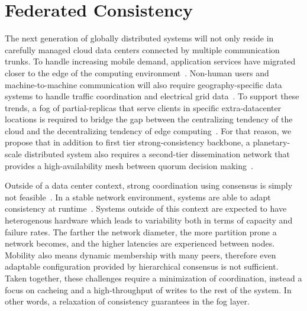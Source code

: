 
\renewcommand{\thechapter}{4}

\chapter{Federated Consistency}
\label{ch:federated_consistency}

The next generation of globally distributed systems will not only reside in carefully managed cloud data centers connected by multiple communication trunks.
To handle increasing mobile demand, application services have migrated closer to the edge of the computing environment~\cite{edge_computing}.
Non-human users and machine-to-machine communication will also require geography-specific data systems to handle traffic coordination and electrical grid data~\cite{cisco_internet_trends,sensor_networks,smart_grid,sotis,iot}.
To support these trends, a fog of partial-replicas that serve clients in specific extra-datacenter locations is required to bridge the gap between the centralizing tendency of the cloud and the decentralizing tendency of edge computing~\cite{fog,fog_mobile,fog_iot}.
For that reason, we propose that in addition to first tier strong-consistency backbone, a planetary-scale distributed system also requires a second-tier dissemination network that provides a high-availability mesh between quorum decision making~\cite{oceanstore}.

Outside of a data center context, strong coordination using consensus is simply not feasible~\cite{sensor_coordination}.
In a stable network environment, systems are able to adapt consistency at runtime~\cite{chihoub_harmony:_2012,chihoub_consistency_2013,kraska_consistency_2009,pitoura_data_1999,deno-toc}.
Systems outside of this context are expected to have heterogenous hardware which leads to variability both in terms of capacity and failure rates.
The farther the network diameter, the more partition prone a network becomes, and the higher latencies are experienced between nodes.
Mobility also means dynamic membership with many peers, therefore even adaptable configuration provided by hierarchical consensus is not sufficient.
Taken together, these challenges require a minimization of coordination, instead a focus on cacheing and a high-throughput of writes to the rest of the system.
In other words, a relaxation of consistency guarantees in the fog layer.


